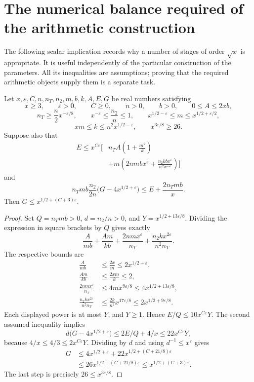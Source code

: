 \section{The numerical balance required of the arithmetic construction}
\label{sec:numerical}

The following scalar implication records why a number of stages of
order $\sqrt{x}$ is appropriate. It is useful independently of the
particular construction of the parameters. All its inequalities are
assumptions; proving that the required arithmetic objects supply
them is a separate task.



\begin{proposition}\label{prop:size}
Let $x,\varepsilon,C,n,n_T,n_2,m,b,k,A,E,G$ be real numbers satisfying
\[
 x\ge3,\qquad \varepsilon>0,\qquad C\ge0,\qquad n>0,\qquad b>0,
 \qquad 0\le A\le2xb,
\]
\[
 n_T\ge\frac n2x^{-\varepsilon/8},\qquad
 x^{-\varepsilon}\le\frac{n_2}{n}\le1,\qquad
 x^{1/2-\varepsilon}\le m\le x^{1/2+\varepsilon/2},
\]
\[
 xm\le k\le n^2x^{1/2-\varepsilon},\qquad
 x^{3\varepsilon/8}\ge26.
\]
Suppose also that
\begin{align*}
E\le x^{C\varepsilon}\biggl[
&n_TA\left(1+\frac{m^2}{k}\right)\\
&+m\left(2nmbx^\varepsilon+
 \frac{n_2kbx^\varepsilon}{n^2x^{-\varepsilon}}\right)\biggr]
\end{align*}
and
\[
 n_Tmb\frac{n_2}{2n}\bigl(G-4x^{1/2+\varepsilon}\bigr)
       \le E+\frac{2n_Tmb}{x}.
\]
Then $G\le x^{1/2+(C+3)\varepsilon}$.
\end{proposition}
\begin{proof}
Set $Q=n_Tmb>0$, $d=n_2/n>0$, and $Y=x^{1/2+13\varepsilon/8}$. Dividing the expression in square brackets by $Q$ gives exactly
\[
 \frac{A}{mb}+\frac{Am}{kb}
 +\frac{2nmx^\varepsilon}{n_T}
 +\frac{n_2kx^{2\varepsilon}}{n^2n_T}.
\]
The respective bounds are
\begin{align*}
 \frac{A}{mb}&\le\frac{2x}{m}\le2x^{1/2+\varepsilon},\\
 \frac{Am}{kb}&\le\frac{2xm}{k}\le2,\\
 \frac{2nmx^\varepsilon}{n_T}&\le4mx^{9\varepsilon/8}
                  \le4x^{1/2+13\varepsilon/8},\\
 \frac{n_2kx^{2\varepsilon}}{n^2n_T}
       &\le\frac{2k}{n^2}x^{17\varepsilon/8}
                  \le2x^{1/2+9\varepsilon/8}.
\end{align*}
Each displayed power is at most $Y$, and $Y\ge1$. Hence $E/Q\le10x^{C\varepsilon}Y$. The second assumed inequality implies
\[
 d\bigl(G-4x^{1/2+\varepsilon}\bigr)
       \le 2E/Q+4/x
       \le22x^{C\varepsilon}Y,
\]
because $4/x\le4/3\le2x^{C\varepsilon}Y$. Dividing by $d$ and using $d^{-1}\le x^\varepsilon$ gives
\begin{align*}
 G&\le4x^{1/2+\varepsilon}
           +22x^{1/2+(C+21/8)\varepsilon}\\
  &\le26x^{1/2+(C+21/8)\varepsilon}
   \le x^{1/2+(C+3)\varepsilon}.
\end{align*}
The last step is precisely $26\le x^{3\varepsilon/8}$.
\end{proof}


